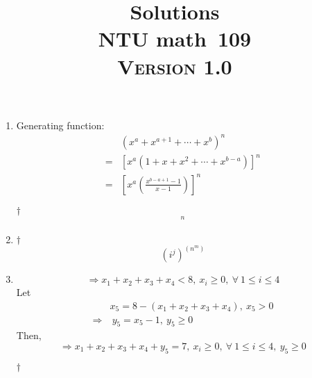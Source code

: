 \documentclass[a4paper,12pt]{article}
\newcommand{\school}{ntu}
\newcommand{\subject}{math}
\renewcommand{\year}{109}
\newcommand{\titlename}{\MakeUppercase{\school} \subject \ \year}
\newcommand{\ver}{\textsc{Version} 1.0} %
\begin{document}
\title{\LARGE{\textbf{Solutions}} \\
	\Huge{\textbf{\titlename}} \\
	\normalsize{\ver}
}
\author{}
\date{}

\maketitle


\begin{enumerate}
	\item Generating function: \begin{equation}
		\begin{aligned}
			& (x^{a} + x^{a + 1} + \cdots + x^{b})^{n} \\
			= & [x^{a} (1 + x + x^2 + \cdots + x^{b - a})]^{n} \\
			= & [x^{a} (\frac{x^{b - a + 1} - 1}{x - 1})]^{n}
		\end{aligned}
	\end{equation}
	\begin{answer}{$\dag$}\begin{equation}
			[x^{a} (\frac{x^{b - a + 1} - 1}{x - 1})]^{n}
		\end{equation}
	\end{answer}
	\item \begin{answer}{$\dag$}\begin{equation}
			(i^{j})^{(n^{m})}
		\end{equation}
	\end{answer}
	\item \begin{equation}
		\Rightarrow x_1 + x_2 + x_3 + x_4 < 8, \ x_i \ge 0, \ \forall \ 1 \le i \le 4
	\end{equation}
	Let \begin{equation}
		\begin{aligned}
			& x_5 = 8 - (x_1 + x_2 + x_3 + x_4), \ x_5 > 0 \\
			\Rightarrow & \ y_5 = x_5 - 1, \ y_5 \ge 0
		\end{aligned}
	\end{equation}
	Then, \begin{equation}
		\Rightarrow x_1 + x_2 + x_3 + x_4 + y_5 = 7, \ x_i \ge 0, \ \forall \ 1 \le i \le 4, \ y_5 \ge 0
	\end{equation}
	\begin{answer}{$\dag$}
		\begin{equation}

\end{equation}
\end{answer}
\end{enumerate}
\end{document}
